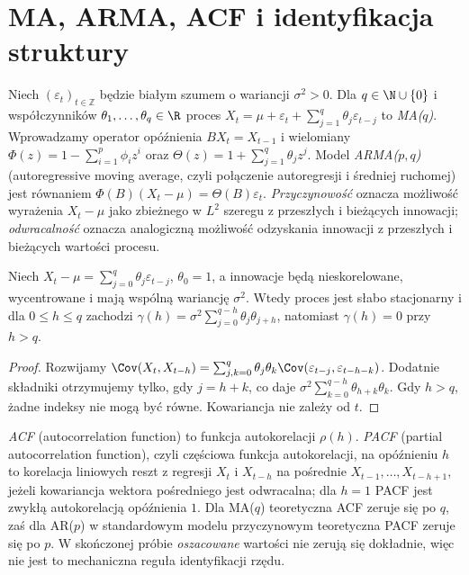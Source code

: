 \section{MA, ARMA, ACF i identyfikacja struktury}
\begin{definicja}
Niech $(\varepsilon_t)_{t\in\mathbb Z}$ będzie
białym szumem o wariancji $\sigma^2>0$.
Dla $q\in\N\cup\{0\}$ i współczynników
$\theta_1,\ldots,\theta_q\in\R$ proces
$X_t=\mu+\varepsilon_t+
\sum_{j=1}^q\theta_j\varepsilon_{t-j}$
to \emph{MA($q$)}. Wprowadzamy operator opóźnienia
$BX_t=X_{t-1}$ i wielomiany
$\Phi(z)=1-\sum_{i=1}^p\phi_i z^i$ oraz
$\Theta(z)=1+\sum_{j=1}^q\theta_j z^j$.
Model \emph{ARMA($p,q$)} (autoregressive moving average,
czyli połączenie autoregresji i średniej ruchomej) jest równaniem
$\Phi(B)(X_t-\mu)=\Theta(B)\varepsilon_t$.
\emph{Przyczynowość} oznacza możliwość wyrażenia
$X_t-\mu$ jako zbieżnego w $L^2$ szeregu
z przeszłych i bieżących innowacji; \emph{odwracalność}
oznacza analogiczną możliwość odzyskania innowacji
z przeszłych i bieżących wartości procesu.
\end{definicja}

\begin{twierdzenie}[Autokowariancja MA($q$)]
\label{thm:maq-cov}
Niech $X_t-\mu=\sum_{j=0}^q\theta_j\varepsilon_{t-j}$,
$\theta_0=1$, a innowacje będą nieskorelowane,
wycentrowane i mają wspólną wariancję $\sigma^2$.
Wtedy proces jest słabo stacjonarny i dla
$0\le h\le q$ zachodzi
$\gamma(h)=\sigma^2\sum_{j=0}^{q-h}\theta_j\theta_{j+h}$,
natomiast $\gamma(h)=0$ przy $h>q$.
\end{twierdzenie}
\begin{proof}
Rozwijamy
$\Cov(X_t,X_{t-h})=\sum_{j,k=0}^q
\theta_j\theta_k\Cov(\varepsilon_{t-j},\varepsilon_{t-h-k})$.
Dodatnie składniki otrzymujemy tylko, gdy
$j=h+k$, co daje $\sigma^2\sum_{k=0}^{q-h}
\theta_{h+k}\theta_k$. Gdy $h>q$, żadne indeksy
nie mogą być równe. Kowariancja nie zależy od $t$.
\end{proof}

\begin{uwaga}
\emph{ACF} (autocorrelation function) to funkcja autokorelacji
$\rho(h)$. \emph{PACF} (partial autocorrelation function),
czyli częściowa funkcja autokorelacji, na opóźnieniu $h$
to korelacja liniowych
reszt z regresji $X_t$ i $X_{t-h}$ na pośrednie
$X_{t-1},\ldots,X_{t-h+1}$, jeżeli kowariancja
wektora pośredniego jest odwracalna; dla $h=1$
PACF jest zwykłą autokorelacją opóźnienia $1$.
Dla MA($q$) teoretyczna ACF zeruje się po $q$,
zaś dla AR($p$) w standardowym modelu przyczynowym
teoretyczna PACF zeruje się po $p$. W skończonej
próbie \emph{oszacowane} wartości nie zerują się dokładnie,
więc nie jest to mechaniczna reguła identyfikacji rzędu.
\end{uwaga}

